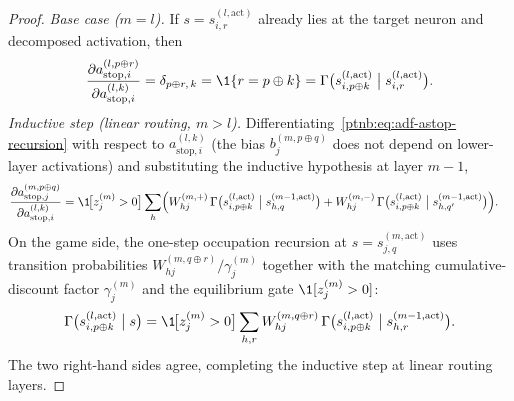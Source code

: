 \begin{proof}
\emph{Base case ($m = l$).} If $s = s_{i,r}^{(l, \mathrm{act})}$ already lies at the target neuron
and decomposed activation, then
\begin{align}
    \frac{\partial a_{\mathrm{stop},i}^{(l, p \oplus r)}}{\partial a_{\mathrm{stop},i}^{(l, k)}}
    = \delta_{p \oplus r,\, k}
    = \1\{r = p \oplus k\}
    = \Gamma\bigl(s_{i, p \oplus k}^{(l, \mathrm{act})} \bigm| s_{i,r}^{(l, \mathrm{act})}\bigr).
\end{align}
\emph{Inductive step (linear routing, $m > l$).} Differentiating~\eqref{ptnb:eq:adf-astop-recursion}
with respect to $a_{\mathrm{stop},i}^{(l, k)}$ (the bias $b_j^{(m, p \oplus q)}$ does not depend on
lower-layer activations) and substituting the inductive hypothesis at layer $m-1$,
\begin{align}
    \frac{\partial a_{\mathrm{stop},j}^{(m, p \oplus q)}}{\partial a_{\mathrm{stop},i}^{(l, k)}}
    &= \1\!\bigl[z_j^{(m)} > 0\bigr]
    \sum_h \Bigl( W_{hj}^{(m,+)}\, \Gamma\bigl(s_{i, p \oplus k}^{(l, \mathrm{act})} \bigm| s_{h,
    q}^{(m-1, \mathrm{act})}\bigr)
    + W_{hj}^{(m,-)}\, \Gamma\bigl(s_{i, p \oplus k}^{(l, \mathrm{act})} \bigm| s_{h, q'}^{(m-1,
    \mathrm{act})}\bigr) \Bigr).
\end{align}
On the game side, the one-step occupation recursion at $s = s_{j,q}^{(m, \mathrm{act})}$ uses
transition probabilities $W_{hj}^{(m, q \oplus r)} / \gamma_j^{(m)}$ together with the matching
cumulative-discount factor $\gamma_j^{(m)}$ and the equilibrium gate $\1[z_j^{(m)} > 0]$:
\begin{align}
    \Gamma\bigl(s_{i, p \oplus k}^{(l, \mathrm{act})} \bigm| s\bigr)
    = \1\!\bigl[z_j^{(m)} > 0\bigr] \sum_{h, r} W_{hj}^{(m, q \oplus r)}\, \Gamma\bigl(s_{i, p \oplus
    k}^{(l, \mathrm{act})} \bigm| s_{h, r}^{(m-1, \mathrm{act})}\bigr).
\end{align}
The two right-hand sides agree, completing the inductive step at linear routing layers.


\end{proof}
